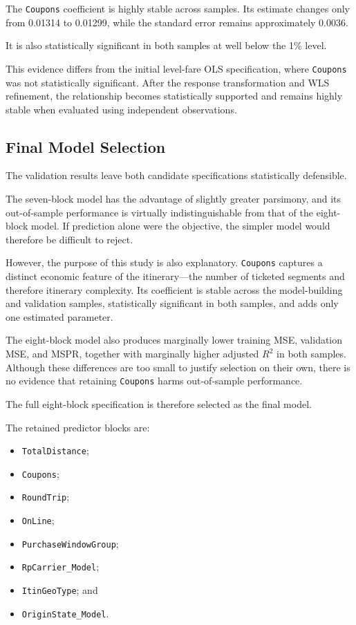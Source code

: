 \documentclass[11pt,a4paper]{article}
\begin{document}
The \texttt{Coupons} coefficient is highly stable across samples. Its estimate changes only from 0.01314 to 0.01299, while the standard error remains approximately 0.0036.

It is also statistically significant in both samples at well below the 1\% level.

This evidence differs from the initial level-fare OLS specification, where \texttt{Coupons} was not statistically significant. After the response transformation and WLS refinement, the relationship becomes statistically supported and remains highly stable when evaluated using independent observations.

\subsection{Final Model Selection}

The validation results leave both candidate specifications statistically defensible.

The seven-block model has the advantage of slightly greater parsimony, and its out-of-sample performance is virtually indistinguishable from that of the eight-block model. If prediction alone were the objective, the simpler model would therefore be difficult to reject.

However, the purpose of this study is also explanatory. \texttt{Coupons} captures a distinct economic feature of the itinerary---the number of ticketed segments and therefore itinerary complexity. Its coefficient is stable across the model-building and validation samples, statistically significant in both samples, and adds only one estimated parameter.

The eight-block model also produces marginally lower training MSE, validation MSE, and MSPR, together with marginally higher adjusted \(R^2\) in both samples. Although these differences are too small to justify selection on their own, there is no evidence that retaining \texttt{Coupons} harms out-of-sample performance.

The full eight-block specification is therefore selected as the final model.

The retained predictor blocks are:

\begin{itemize}
    \item \texttt{TotalDistance};
    \item \texttt{Coupons};
    \item \texttt{RoundTrip};
    \item \texttt{OnLine};
    \item \texttt{PurchaseWindowGroup};
    \item \texttt{RpCarrier\_Model};
    \item \texttt{ItinGeoType}; and
    \item \texttt{OriginState\_Model}.
\end{itemize}
\end{document}
